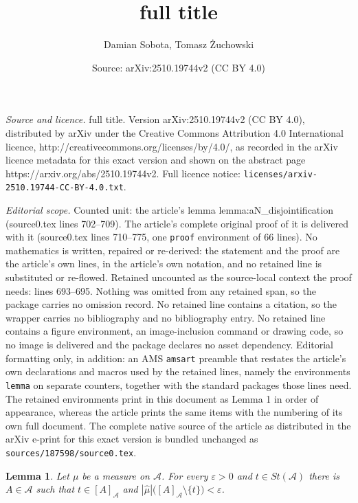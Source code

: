 \documentclass[10pt,a4paper]{amsart}
\title{full title}
\author{Damian Sobota, Tomasz \.Zuchowski}
\date{Source: arXiv:2510.19744v2 (CC BY 4.0)}
\newtheorem{lemma}{Lemma}
\newcommand{\aA}{\mathcal{A}}
\newcommand{\clopen}[1]{\left[#1\right]}
\newcommand{\eps}{\varepsilon}
\newcommand{\iA}{\in\aA}
\newcommand{\sm}{\setminus}
\newcommand{\wh}{\widehat}
\begin{document}
\maketitle

\noindent\emph{Source and licence.} full title. Version arXiv:2510.19744v2 (CC BY 4.0), distributed by arXiv under the Creative Commons Attribution 4.0 International licence, http://creativecommons.org/licenses/by/4.0/, as recorded in the arXiv licence metadata for this exact version and shown on the abstract page https://arxiv.org/abs/2510.19744v2. Full licence notice: \texttt{licenses/arxiv-2510.19744-CC-BY-4.0.txt}.\par\smallskip

\noindent\textit{Editorial scope.} Counted unit: the article's lemma lemma:aN\_disjointification (source0.tex lines 702--709). The article's complete original proof of it is delivered with it (source0.tex lines 710--775, one \texttt{proof} environment of 66 lines). No mathematics is written, repaired or re-derived: the statement and the proof are the article's own lines, in the article's own notation, and no retained line is substituted or re-flowed.  Retained uncounted as the source-local context the proof needs: lines 693--695.  Nothing was omitted from any retained span, so the package carries no omission record.  No retained line contains a citation, so the wrapper carries no bibliography and no bibliography entry.  No retained line contains a figure environment, an image-inclusion command or drawing code, so no image is delivered and the package declares no asset dependency.  Editorial formatting only, in addition: an AMS \texttt{amsart} preamble that restates the article's own declarations and macros used by the retained lines, namely the environments \texttt{lemma} on separate counters, together with the standard packages those lines need.  The retained environments print in this document as Lemma 1 in order of appearance, whereas the article prints the same items with the numbering of its own full document.  The complete native source of the article as distributed in the arXiv e-print for this exact version is bundled unchanged as \texttt{sources/187598/source0.tex}.
\begin{lemma}\label{lemma:small_nhbds}
Let $\mu$ be a measure on $\aA$. For every $\eps>0$ and $t\in St(\aA)$ there is $A\iA$ such that $t\in \clopen{A}_\aA$ and $|\wh{\mu}|\big(\clopen{A}_\aA\sm\{t\}\big)<\eps$.
\end{lemma}
\end{document}
